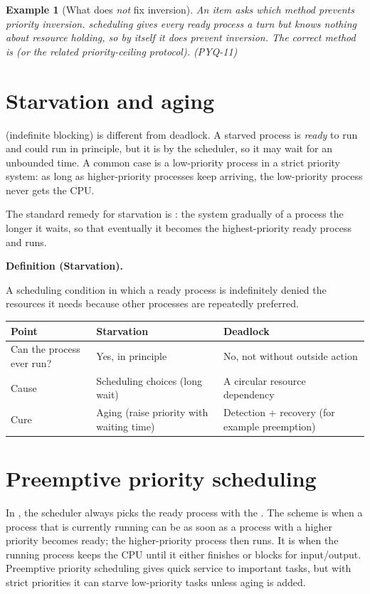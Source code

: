\documentclass[11pt]{article}
\newtheorem{example}{Example}[section]
\newenvironment{definitionbox}[1]{%
  \par\noindent\textbf{Definition (#1).}\ \itshape
}{\par\vspace{0.3em}}
\begin{document}
\begin{example}[What does \emph{not} fix inversion]
An item asks which method prevents priority inversion. 
scheduling gives every ready process a turn but knows nothing about resource
holding, so by itself it does  prevent inversion. The correct method
is  (or the related priority-ceiling protocol).
(PYQ-11)
\end{example}

\section{Starvation and aging}
 (indefinite blocking) is different from deadlock. A starved
process is \emph{ready} to run and could run in principle, but it is
 by the scheduler, so it may wait for an
unbounded time. A common case is a low-priority process in a strict priority
system: as long as higher-priority processes keep arriving, the low-priority
process never gets the CPU.

The standard remedy for starvation is : the system gradually
 of a process the longer it waits, so that eventually
it becomes the highest-priority ready process and runs.

\begin{definitionbox}{Starvation}
A scheduling condition in which a ready process is indefinitely denied the
resources it needs because other processes are repeatedly preferred.
\end{definitionbox}

\begin{center}
\begin{tabular}{p{}p{}p{}}
\toprule
\textbf{Point} & \textbf{Starvation} & \textbf{Deadlock} \\
\midrule
Can the process ever run? & Yes, in principle & No, not without outside action \\
Cause & Scheduling choices (long wait) & A circular resource dependency \\
Cure & Aging (raise priority with waiting time) & Detection + recovery (for example preemption) \\
\bottomrule
\end{tabular}
\end{center}

\section{Preemptive priority scheduling}
In , the scheduler always picks the ready process with
the . The scheme is  when a process that
is currently running can be  as soon as a process with a
higher priority becomes ready; the higher-priority process then runs. It is
 when the running process keeps the CPU until it either
finishes or blocks for input/output. Preemptive priority scheduling gives
quick service to important tasks, but with strict priorities it can starve
low-priority tasks unless aging is added.
\end{document}
